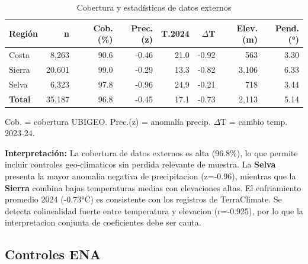 \documentclass[10pt,a4paper]{article}
\begin{document}
\begin{table}[H]
\centering
\caption{Cobertura y estadísticas de datos externos}
\label{tab:geo_coverage}
\begin{threeparttable}
\small
\begin{tabular}{lrrrrrrr}
\toprule
\textbf{Región} & \textbf{n} & \textbf{Cob. (\%)} & \textbf{Prec.(z)} & \textbf{T.2024} & \textbf{$\Delta$T} & \textbf{Elev.(m)} & \textbf{Pend.(°)} \\
\midrule
Costa & 8,263 & 90.6 & -0.46 & 21.0 & -0.92 & 563 & 3.30 \\
Sierra & 20,601 & 99.0 & -0.29 & 13.3 & -0.82 & 3,106 & 6.33 \\
Selva & 6,323 & 97.8 & -0.96 & 24.9 & -0.21 & 718 & 3.44 \\
\midrule
\textbf{Total} & 35,187 & 96.8 & -0.45 & 17.1 & -0.73 & 2,113 & 5.14 \\
\bottomrule
\end{tabular}
\begin{tablenotes}
\footnotesize
\item Cob. = cobertura UBIGEO. Prec.(z) = anomalía precip. $\Delta$T = cambio temp. 2023-24.
\end{tablenotes}
\end{threeparttable}
\end{table}

\textbf{Interpretación:} La cobertura de datos externos es alta (96.8\%), lo que permite incluir controles geo-climaticos sin perdida relevante de muestra. La \textbf{Selva} presenta la mayor anomalia negativa de precipitacion (z=-0.96), mientras que la \textbf{Sierra} combina bajas temperaturas medias con elevaciones altas. El enfriamiento promedio 2024 (-0.73°C) es consistente con los registros de TerraClimate. Se detecta colinealidad fuerte entre temperatura y elevacion (r=-0.925), por lo que la interpretacion conjunta de coeficientes debe ser cauta.

\subsection{Controles ENA}
\end{document}
